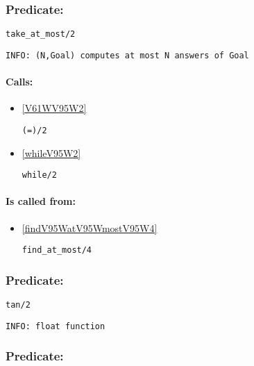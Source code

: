 \subsubsection{Predicate:} \label{takeV95WatV95WmostV95W2}

\begin{verbatim}
take_at_most/2
\end{verbatim}

{\small \begin{verbatim}
INFO: (N,Goal) computes at most N answers of Goal

\end{verbatim}}
\paragraph{Calls:} 
\begin{itemize}
\item \ref{V61WV95W2} 
\begin{verbatim}
(=)/2
\end{verbatim}

\item \ref{whileV95W2} 
\begin{verbatim}
while/2
\end{verbatim}

\end{itemize}
\paragraph{Is called from:} 
\begin{itemize}
\item \ref{findV95WatV95WmostV95W4} 
\begin{verbatim}
find_at_most/4
\end{verbatim}

\end{itemize}

\subsubsection{Predicate:} \label{tanV95W2}

\begin{verbatim}
tan/2
\end{verbatim}

{\small \begin{verbatim}
INFO: float function

\end{verbatim}}

\subsubsection{Predicate:} \label{tellV95W1}

